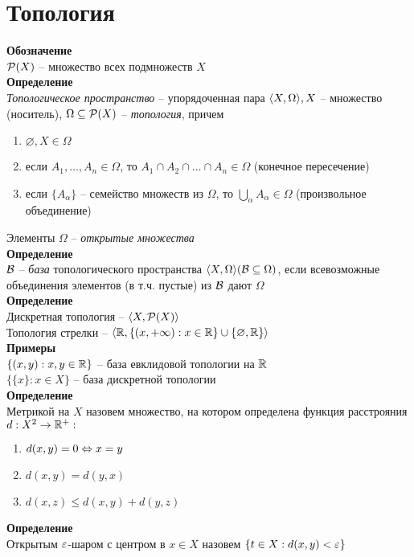 \documentclass[12pt]{article}
\begin{document}
\section{Топология}
\textbf{Обозначение}\\
$\mathcal P(X)$ -- множество всех подмножеств $X$\\
\textbf{Определение}\\
\textit{Топологическое пространство} -- упорядоченная пара $\langle X, \Omega \rangle, X$ -- множество (носитель), $\Omega \subseteq \mathcal P(X)$ -- \textit{топология}, причем
\begin{enumerate}
    \item $\varnothing, X \in \Omega$
    \item если $A_1, \ldots, A_n \in \Omega$, то $A_1 \cap A_2 \cap \ldots \cap A_n \in \Omega$ (конечное пересечение)
    \item если $\{A_\alpha\}$ -- семейство множеств из $\Omega$, то $\bigcup_\alpha A_\alpha \in \Omega$ (произвольное объединение)
\end{enumerate}
Элементы $\Omega$ -- \textit{открытые множества}\\
\textbf{Определение}\\
$\mathcal{B}$ -- \textit{база} топологического пространства $\langle X, \Omega \rangle (\mathcal{B} \subseteq \Omega)$, если всевозможные объединения элементов (в т.ч. пустые) из $\mathcal{B}$ дают $\Omega$\\
\textbf{Определение}\\
Дискретная топология -- $\langle X, \mathcal P(X) \rangle$\\
Топология стрелки -- $\langle \mathbb{R}, \{(x, +\infty):x\in \mathbb{R}\} \cup \{\varnothing, \mathbb{R}\} \rangle$\\
\textbf{Примеры}\\
$\{(x,y): x,y \in \mathbb{R}\}$ -- база евклидовой топологии на $\mathbb{R}$\\
$\{\{x\}: x \in X\}$ -- база дискретной топологии\\
\textbf{Определение}\\
Метрикой на $X$ назовем множество, на котором определена функция расстрояния $d: X^2 \rightarrow \mathbb{R}^+:$
\begin{enumerate}
    \item $d(x,y) = 0 \Leftrightarrow x = y$
    \item $d(x,y) = d(y,x)$
    \item $d(x,z) \leq d(x,y) + d(y,z)$
\end{enumerate}
\textbf{Определение}\\
Открытым $\varepsilon$-шаром с центром в $x\in X$ назовем $\{t \in X: d(x,y) < \varepsilon\}$\\
\end{document}
